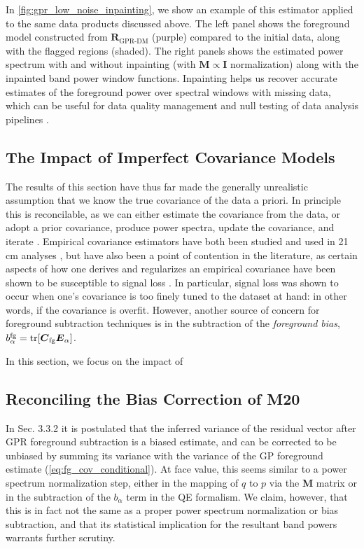 \documentclass[a4paper,fleqn,usenatbib]{mnras}
\def\E{\boldsymbol{E}}
\def\R{\boldsymbol{R}}
\def\M{\boldsymbol{M}}
\def\Cfg{\boldsymbol{C}_{\rm fg}}
\def\I{\boldsymbol{I}}
\def\tr{{\rm tr}}
\begin{document}
In \autoref{fig:gpr_low_noise_inpainting}, we show an example of this estimator applied to the same data products discussed above.
The left panel shows the foreground model constructed from $\R_{\operatorname{GPR-DM}}$ (purple) compared to the initial data, along with the flagged regions (shaded).
The right panels shows the estimated power spectrum with and without inpainting (with $\M\propto\I$ normalization) along with the inpainted band power window functions.
Inpainting helps us recover accurate estimates of the foreground power over spectral windows with missing data, which can be useful for data quality management and null testing of data analysis pipelines \citep{Kolopanis2019}.


\subsection{The Impact of Imperfect Covariance Models}
\label{sec:cov_models}

The results of this section have thus far made the generally unrealistic assumption that we know the true covariance of the data a priori.
In principle this is reconcilable, as we can either estimate the covariance from the data, or adopt a prior covariance, produce power spectra, update the covariance, and iterate \citep{Bunn1995, Tegmark, Padmanabhan2001}.
Empirical covariance estimators have both been studied and used in 21\,cm analyses \citep{Dillon2014, Ali2015, Switzer, Eastwood, Masui}, but have also been a point of contention in the literature, as certain aspects of how one derives and regularizes an empirical covariance have been shown to be susceptible to signal loss \citep{Cheng2018}.
In particular, signal loss was shown to occur when one's covariance is too finely tuned to the dataset at hand: in other words, if the covariance is overfit.
However, another source of concern for foreground subtraction techniques is in the subtraction of the \emph{foreground bias}, $b^{\rm fg}_\alpha = \tr[\Cfg\E_\alpha]$.

In this section, we focus on the impact of 


\subsection{Reconciling the Bias Correction of M20}
\label{sec:bias_correction}

In  Sec. 3.3.2 it is postulated that the inferred variance of the residual vector after GPR foreground subtraction is a biased estimate, and can be corrected to be unbiased by summing its variance with the variance of the GP foreground estimate (\autoref{eq:fg_cov_conditional}).
At face value, this seems similar to a power spectrum normalization step, either in the mapping of $q$ to $p$ via the $\M$ matrix or in the subtraction of the $b_\alpha$ term in the QE formalism.
We claim, however, that this is in fact not the same as a proper power spectrum normalization or bias subtraction, and that its statistical implication for the resultant band powers warrants further scrutiny.
\end{document}
